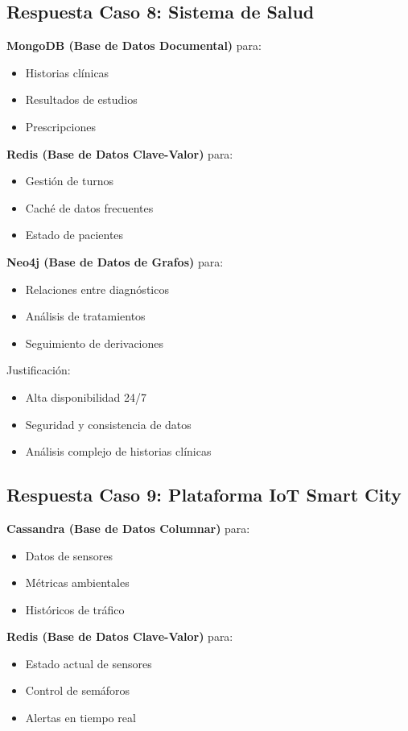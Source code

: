 \documentclass[12pt]{article}
\begin{document}
\subsection{Respuesta Caso 8: Sistema de Salud}

\textbf{MongoDB (Base de Datos Documental)} para:
\begin{itemize}
    \item Historias clínicas
    \item Resultados de estudios
    \item Prescripciones
\end{itemize}

\textbf{Redis (Base de Datos Clave-Valor)} para:
\begin{itemize}
    \item Gestión de turnos
    \item Caché de datos frecuentes
    \item Estado de pacientes
\end{itemize}

\textbf{Neo4j (Base de Datos de Grafos)} para:
\begin{itemize}
    \item Relaciones entre diagnósticos
    \item Análisis de tratamientos
    \item Seguimiento de derivaciones
\end{itemize}

Justificación:
\begin{itemize}
    \item Alta disponibilidad 24/7
    \item Seguridad y consistencia de datos
    \item Análisis complejo de historias clínicas
\end{itemize}

\subsection{Respuesta Caso 9: Plataforma IoT Smart City}

\textbf{Cassandra (Base de Datos Columnar)} para:
\begin{itemize}
    \item Datos de sensores
    \item Métricas ambientales
    \item Históricos de tráfico
\end{itemize}

\textbf{Redis (Base de Datos Clave-Valor)} para:
\begin{itemize}
    \item Estado actual de sensores
    \item Control de semáforos
    \item Alertas en tiempo real
\end{itemize}
\end{document}
